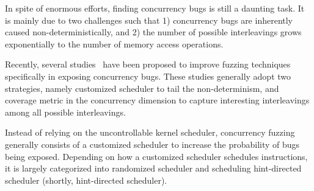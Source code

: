 

In spite of enormous efforts, finding concurrency bugs is still a
daunting task.
%
It is mainly due to two challenges such that 1) concurrency bugs are
inherently caused non-deterministically, and 2) the number of possible
interleavings grows exponentially to the number of memory access
operations.

Recently, several studies~\cite{razzer, krace, snowboard, muzz} have
been proposed to improve fuzzing techniques specifically in exposing
concurrency bugs.
%
These studies generally adopt two strategies, namely customized
scheduler to tail the non-determinism, and coverage metric in the
concurrency dimension to capture interesting interleavings among all
possible interleavings.




%
Instead of relying on the uncontrollable kernel scheduler, concurrency
fuzzing generally consists of a customized scheduler to increase the
probability of bugs being exposed.
%
Depending on how a customized scheduler schedules instructions, it is
largely categorized into randomized scheduler and scheduling
hint-directed scheduler (shortly, hint-directed scheduler).

